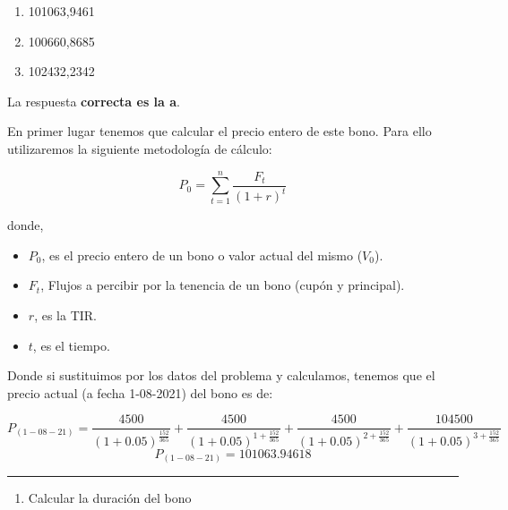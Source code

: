 \documentclass[
  letterpaper,
  DIV=11,
  numbers=noendperiod]{scrreprt}
\providecommand{\tightlist}{%
  \setlength{\itemsep}{0pt}\setlength{\parskip}{0pt}}\usepackage{longtable,booktabs,array}
\begin{document}
\begin{tcolorbox}
\begin{enumerate}
\def\labelenumi{\alph{enumi}.}
\item
  101063,9461
\item
  100660,8685
\item
  102432,2342
\end{enumerate}

\begin{tcolorbox}[enhanced jigsaw, toprule=.15mm, left=2mm, breakable, opacitybacktitle=0.6, toptitle=1mm, coltitle=black, arc=.35mm, leftrule=.75mm, bottomtitle=1mm, titlerule=0mm, title=\textcolor{quarto-callout-tip-color}{\faLightbulb}\hspace{0.5em}{Solución}, rightrule=.15mm, opacityback=0, bottomrule=.15mm, colback=white, colframe=quarto-callout-tip-color-frame, colbacktitle=quarto-callout-tip-color!10!white]

La respuesta \textbf{correcta es la a}.

En primer lugar tenemos que calcular el precio entero de este bono. Para
ello utilizaremos la siguiente metodología de cálculo:

\[P_0=\sum_{ t=1}^{ n}\frac{F_t}{(1+r)^{t}}\]

donde,

\begin{itemize}
\item
  \(P_0\), es el precio entero de un bono o valor actual del mismo
  (\(V_0\)).
\item
  \(F_t\), Flujos a percibir por la tenencia de un bono (cupón y
  principal).
\item
  \(r\), es la TIR.
\item
  \(t\), es el tiempo.
\end{itemize}

Donde si sustituimos por los datos del problema y calculamos, tenemos
que el precio actual (a fecha 1-08-2021) del bono es de:

\[P_{(1-08-21)}=\frac{4500}{\left(1+0.05\right)^{\frac{152}{365}}}+\frac{4500}{\left(1+0.05\right)^{1+\frac{152}{365}}}+\frac{4500}{\left(1+0.05\right)^{2+\frac{152}{365}}}+\frac{104500}{\left(1+0.05\right)^{3+\frac{152}{365}}}\]
\[P_{(1-08-21)}=101063.94618\]

\end{tcolorbox}

\begin{center}\rule{0.5\linewidth}{0.5pt}\end{center}

\begin{enumerate}
\def\labelenumi{\arabic{enumi}.}
\setcounter{enumi}{1}
\tightlist
\item
  Calcular la duración del bono
\end{enumerate}


\end{tcolorbox}
\end{document}
